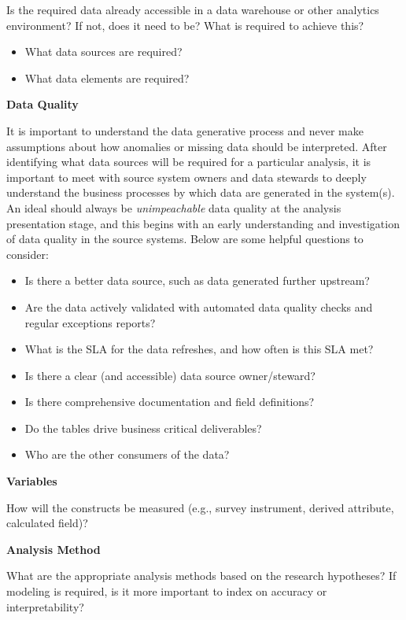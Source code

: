 \documentclass[
]{book}
\providecommand{\tightlist}{%
  \setlength{\itemsep}{0pt}\setlength{\parskip}{0pt}}
\begin{document}
Is the required data already accessible in a data warehouse or other analytics environment? If not, does it need to be? What is required to achieve this?

\begin{itemize}
\tightlist
\item
  What data sources are required?
\item
  What data elements are required?
\end{itemize}

\textbf{Data Quality}

It is important to understand the data generative process and never make assumptions about how anomalies or missing data should be interpreted. After identifying what data sources will be required for a particular analysis, it is important to meet with source system owners and data stewards to deeply understand the business processes by which data are generated in the system(s). An ideal should always be \emph{unimpeachable} data quality at the analysis presentation stage, and this begins with an early understanding and investigation of data quality in the source systems. Below are some helpful questions to consider:

\begin{itemize}
\tightlist
\item
  Is there a better data source, such as data generated further upstream?
\item
  Are the data actively validated with automated data quality checks and regular exceptions reports?
\item
  What is the SLA for the data refreshes, and how often is this SLA met?
\item
  Is there a clear (and accessible) data source owner/steward?
\item
  Is there comprehensive documentation and field definitions?
\item
  Do the tables drive business critical deliverables?
\item
  Who are the other consumers of the data?
\end{itemize}

\textbf{Variables}

How will the constructs be measured (e.g., survey instrument, derived attribute, calculated field)?

\textbf{Analysis Method}

What are the appropriate analysis methods based on the research hypotheses? If modeling is required, is it more important to index on accuracy or interpretability?
\end{document}
